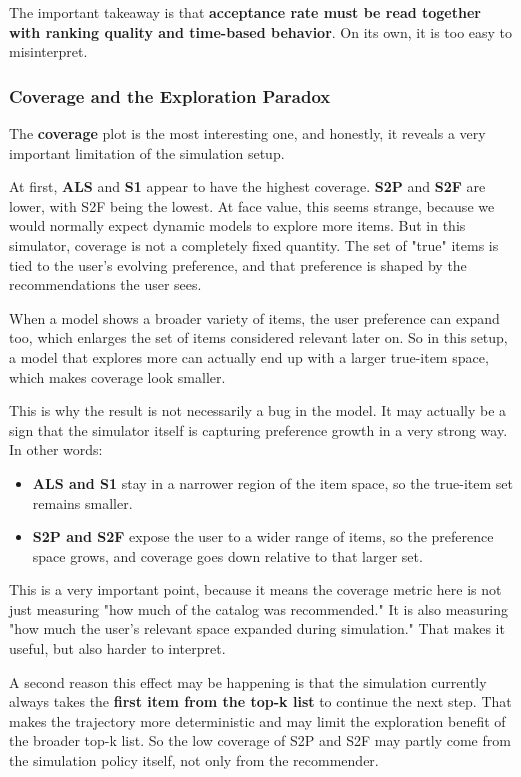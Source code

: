 The important takeaway is that \textbf{acceptance rate must be read together with ranking quality and time-based behavior}. 
On its own, it is too easy to misinterpret.

\subsubsection{Coverage and the Exploration Paradox}

The \textbf{coverage} plot is the most interesting one, and honestly, it reveals a very important limitation of the simulation setup.

At first, \textbf{ALS} and \textbf{S1} appear to have the highest coverage. 
\textbf{S2P} and \textbf{S2F} are lower, with S2F being the lowest. 
At face value, this seems strange, because we would normally expect dynamic models to explore more items. 
But in this simulator, coverage is not a completely fixed quantity. 
The set of "true" items is tied to the user's evolving preference, and that preference is shaped by the recommendations the user sees.

When a model shows a broader variety of items, the user preference can expand too, which enlarges the set of items considered relevant later on. 
So in this setup, a model that explores more can actually end up with a larger true-item space, which makes coverage look smaller.

This is why the result is not necessarily a bug in the model. 
It may actually be a sign that the simulator itself is capturing preference growth in a very strong way. 
In other words:

\begin{itemize}
    \item \textbf{ALS and S1} stay in a narrower region of the item space, so the true-item set remains smaller.
    \item \textbf{S2P and S2F} expose the user to a wider range of items, so the preference space grows, and coverage goes down relative to that larger set.
\end{itemize}

This is a very important point, because it means the coverage metric here is not just measuring "how much of the catalog was recommended." 
It is also measuring "how much the user's relevant space expanded during simulation." 
That makes it useful, but also harder to interpret.

A second reason this effect may be happening is that the simulation currently always takes the \textbf{first item from the top-k list} to continue the next step. 
That makes the trajectory more deterministic and may limit the exploration benefit of the broader top-k list. 
So the low coverage of S2P and S2F may partly come from the simulation policy itself, not only from the recommender.

